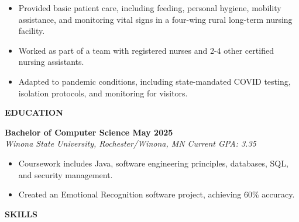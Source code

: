 \begin{itemize}
\item
  Provided basic patient care, including feeding, personal hygiene,
  mobility assistance, and monitoring vital signs in a four-wing rural
  long-term nursing facility.
\item
  Worked as part of a team with registered nurses and 2-4 other
  certified nursing assistants.
\item
  Adapted to pandemic conditions, including state-mandated COVID
  testing, isolation protocols, and monitoring for visitors.
\end{itemize}

\textbf{EDUCATION}

\textbf{Bachelor of Computer Science May 2025}\\
\emph{Winona State University, Rochester/Winona, MN} \emph{Current GPA:
3.35}

\begin{itemize}
\item
  Coursework includes Java, software engineering principles, databases,
  SQL, and security management.
\item
  Created an Emotional Recognition software project, achieving 60\%
  accuracy.
\end{itemize}

\textbf{SKILLS}

